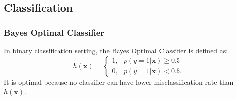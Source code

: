 \subsection{Classification}
        \subsubsection{Bayes Optimal Classifier}
            In binary classification setting, the Bayes Optimal Classifier is defined as:
                \begin{equation}
                    h(\bm{x}) = \begin{cases} 1, & p(y=1 | \bm{x}) \ge 0.5 \\
                                              0, & p(y=1 | \bm{x}) < 0.5.
                    \end{cases}
                \end{equation}      
            It is optimal because no classifier can have lower misclassification rate than $h(\bm{x})$.
